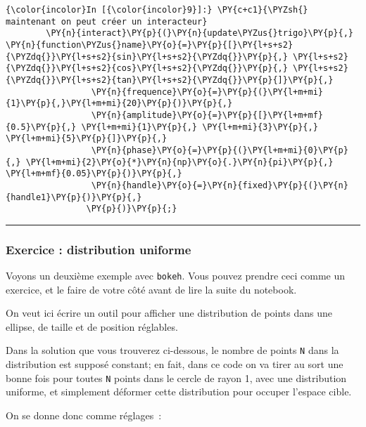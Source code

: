     \begin{Verbatim}[commandchars=\\\{\},frame=single,framerule=0.3mm,rulecolor=\color{cellframecolor}]
{\color{incolor}In [{\color{incolor}9}]:} \PY{c+c1}{\PYZsh{} maintenant on peut créer un interacteur}
        \PY{n}{interact}\PY{p}{(}\PY{n}{update\PYZus{}trigo}\PY{p}{,} \PY{n}{function\PYZus{}name}\PY{o}{=}\PY{p}{[}\PY{l+s+s2}{\PYZdq{}}\PY{l+s+s2}{sin}\PY{l+s+s2}{\PYZdq{}}\PY{p}{,} \PY{l+s+s2}{\PYZdq{}}\PY{l+s+s2}{cos}\PY{l+s+s2}{\PYZdq{}}\PY{p}{,} \PY{l+s+s2}{\PYZdq{}}\PY{l+s+s2}{tan}\PY{l+s+s2}{\PYZdq{}}\PY{p}{]}\PY{p}{,}
                 \PY{n}{frequence}\PY{o}{=}\PY{p}{(}\PY{l+m+mi}{1}\PY{p}{,}\PY{l+m+mi}{20}\PY{p}{)}\PY{p}{,}
                 \PY{n}{amplitude}\PY{o}{=}\PY{p}{[}\PY{l+m+mf}{0.5}\PY{p}{,} \PY{l+m+mi}{1}\PY{p}{,} \PY{l+m+mi}{3}\PY{p}{,} \PY{l+m+mi}{5}\PY{p}{]}\PY{p}{,}
                 \PY{n}{phase}\PY{o}{=}\PY{p}{(}\PY{l+m+mi}{0}\PY{p}{,} \PY{l+m+mi}{2}\PY{o}{*}\PY{n}{np}\PY{o}{.}\PY{n}{pi}\PY{p}{,} \PY{l+m+mf}{0.05}\PY{p}{)}\PY{p}{,}
                 \PY{n}{handle}\PY{o}{=}\PY{n}{fixed}\PY{p}{(}\PY{n}{handle1}\PY{p}{)}\PY{p}{,}
                \PY{p}{)}\PY{p}{;}
\end{Verbatim}


    \begin{center}\rule{0.5\linewidth}{\linethickness}\end{center}

    \hypertarget{exercice-distribution-uniforme}{%
\subsubsection{Exercice : distribution
uniforme}\label{exercice-distribution-uniforme}}

    Voyons un deuxième exemple avec \texttt{bokeh}. Vous pouvez prendre ceci
comme un exercice, et le faire de votre côté avant de lire la suite du
notebook.

    On veut ici écrire un outil pour afficher une distribution de points
dans une ellipse, de taille et de position réglables.

Dans la solution que vous trouverez ci-dessous, le nombre de points
\texttt{N} dans la distribution est supposé constant; en fait, dans ce
code on va tirer au sort une bonne fois pour toutes \texttt{N} points
dans le cercle de rayon 1, avec une distribution uniforme, et simplement
déformer cette distribution pour occuper l'espace cible.

On se donne donc comme réglages~:

